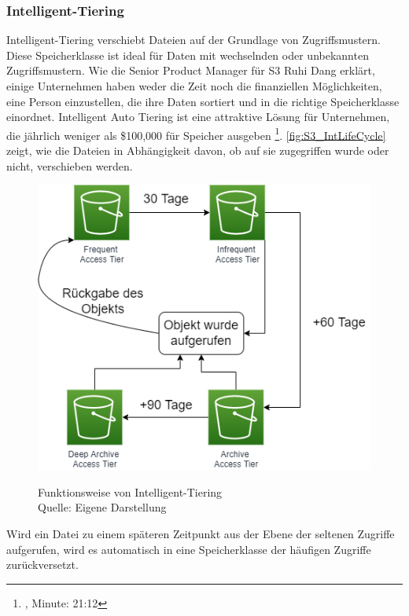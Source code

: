 \newpage
\subsubsection{Intelligent-Tiering}
Intelligent-Tiering verschiebt Dateien auf der Grundlage von Zugriffsmustern. Diese Speicherklasse ist ideal für Daten mit wechselnden oder unbekannten Zugriffsmustern. 
Wie die Senior Product Manager für S3 Ruhi Dang erklärt, einige Unternehmen haben weder die Zeit noch die finanziellen Möglichkeiten, eine Person einzustellen, die ihre Daten sortiert und in die richtige Speicherklasse einordnet. Intelligent Auto Tiering ist eine attraktive Lösung für Unternehmen, die jährlich weniger als \$100,000 für Speicher ausgeben \footnote{\cite{AMZ16}, Minute: 21:12}.
\autoref{fig:S3_IntLifeCycle} zeigt, wie die Dateien in Abhängigkeit davon, ob auf sie zugegriffen wurde oder nicht, verschieben werden. 
\begin{figure}[h!]
  \centering
  \includegraphics[scale=0.7]{sources/S3_IntLifeCycle}
  \caption[Funktionsweise von Intelligent-Tiering]{}\label{fig:S3_IntLifeCycle} Funktionsweise von Intelligent-Tiering\\
  Quelle: Eigene Darstellung
\end{figure}
Wird ein Datei zu einem späteren Zeitpunkt aus der Ebene der seltenen Zugriffe aufgerufen, wird es automatisch in eine Speicherklasse der häufigen Zugriffe zurückversetzt.















